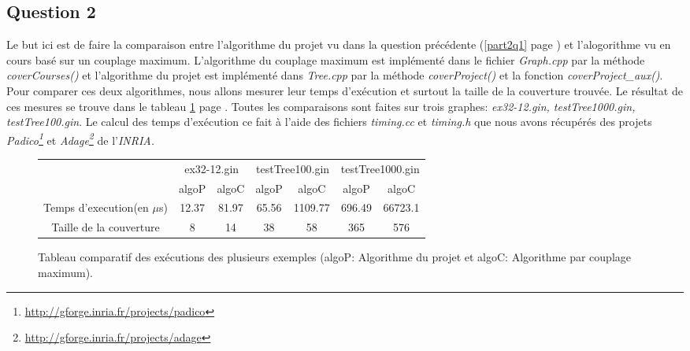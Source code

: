   \subsection{Question 2}
  Le but ici est de faire la comparaison entre l'algorithme du projet vu
  dans la question précédente (\ref{part2q1} page \pageref{part2q1}) et
  l'alogorithme vu en cours basé sur un couplage maximum.\newline
  \indent L'algorithme du couplage maximum est implémenté dans le fichier
  \emph{Graph.cpp} par la méthode \emph{coverCourses()} et l'algorithme
  du projet est implémenté dans \emph{Tree.cpp} par la méthode
  \emph{coverProject()} et la fonction \emph{coverProject\_aux()}.\newline
  \indent Pour comparer ces deux algorithmes, nous allons mesurer leur
  temps d'exécution et surtout la taille de la couverture trouvée. Le
  résultat de ces mesures se trouve dans le tableau \ref{tableau}
  page \pageref{tableau}. Toutes les comparaisons sont faites sur trois
  graphes: \emph{ex32-12.gin, testTree1000.gin, testTree100.gin}.\newline
  \indent Le calcul des temps d'exécution ce fait à l'aide des fichiers
  \emph{timing.cc} et \emph{timing.h} que nous avons récupérés des
  projets \emph{Padico\footnote{\url{http://gforge.inria.fr/projects/padico}}}
  et \emph{Adage\footnote{\url{http://gforge.inria.fr/projects/adage}}} de
  l'\emph{INRIA.}\newline

  \begin{figure}[!ht]
   \begin{center}
    \begin{tabular}{|c|c|c|c|c|c|c|}
     \cline{2-7}
     \multicolumn{1}{c|}{} & \multicolumn{2}{|c|}{ex32-12.gin}
     &\multicolumn{2}{|c|}{testTree100.gin} &
     \multicolumn{2}{|c|}{testTree1000.gin}\\ 
     \cline{2-7}
     \multicolumn{1}{c|}{} & algoP & algoC & algoP & algoC & algoP &
     algoC\\
     \hline
     Temps d'execution(en $\mu$s) & 12.37 & 81.97 & 65.56 & 1109.77 &
     696.49 & 66723.1\\
     \hline
     Taille de la couverture & 8 & 14 & 38 & 58 & 365 & 576\\
     \hline
    \end{tabular}
    \caption{Tableau comparatif des exécutions des plusieurs
    exemples (algoP: Algorithme du projet et algoC: Algorithme par
    couplage maximum).\label{tableau}} 
   \end{center}
  \end{figure}  

